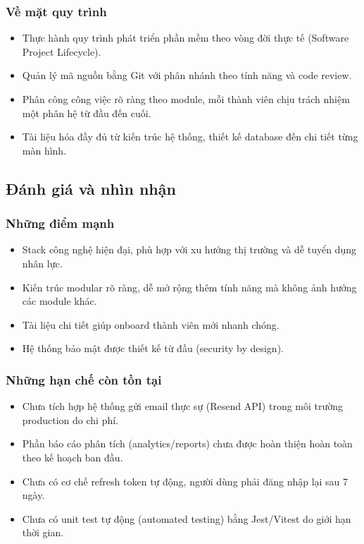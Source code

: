 \subsubsection*{Về mặt quy trình}
\begin{itemize}
    \item Thực hành quy trình phát triển phần mềm theo vòng đời thực tế (Software Project Lifecycle).
    \item Quản lý mã nguồn bằng Git với phân nhánh theo tính năng và code review.
    \item Phân công công việc rõ ràng theo module, mỗi thành viên chịu trách nhiệm một phân hệ từ đầu đến cuối.
    \item Tài liệu hóa đầy đủ từ kiến trúc hệ thống, thiết kế database đến chi tiết từng màn hình.
\end{itemize}

\subsection{Đánh giá và nhìn nhận}

\subsubsection*{Những điểm mạnh}
\begin{itemize}
    \item Stack công nghệ hiện đại, phù hợp với xu hướng thị trường và dễ tuyển dụng nhân lực.
    \item Kiến trúc modular rõ ràng, dễ mở rộng thêm tính năng mà không ảnh hưởng các module khác.
    \item Tài liệu chi tiết giúp onboard thành viên mới nhanh chóng.
    \item Hệ thống bảo mật được thiết kế từ đầu (security by design).
\end{itemize}

\subsubsection*{Những hạn chế còn tồn tại}
\begin{itemize}
    \item Chưa tích hợp hệ thống gửi email thực sự (Resend API) trong môi trường production do chi phí.
    \item Phần báo cáo phân tích (analytics/reports) chưa được hoàn thiện hoàn toàn theo kế hoạch ban đầu.
    \item Chưa có cơ chế refresh token tự động, người dùng phải đăng nhập lại sau 7 ngày.
    \item Chưa có unit test tự động (automated testing) bằng Jest/Vitest do giới hạn thời gian.
\end{itemize}

